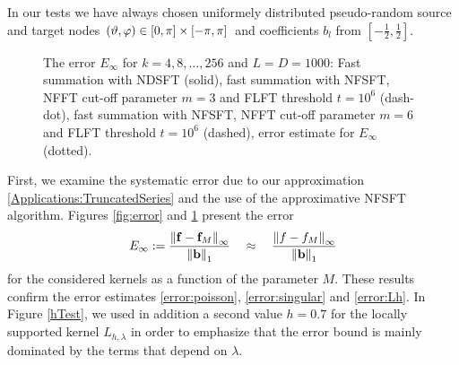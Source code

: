 In our tests we have always chosen uniformely distributed pseudo-random 
source and target nodes 
$\left(\vartheta,\varphi\right) \in [0,\pi] \times [-\pi,\pi]$ and 
coefficients $b_l$ from $\left[-\frac{1}{2},\frac{1}{2}\right]$.

\begin{figure}[tb]
  \centering
  \hfill
  \caption{The error $E_{\infty}$ for $k = 4,8,\ldots,256$ and $L = D = 1000$: 
  Fast summation with NDSFT (solid), fast summation with NFSFT, 
  NFFT cut-off parameter $m = 3$ and FLFT threshold $t = 10^6$ (dash-dot), 
  fast summation with NFSFT, NFFT cut-off parameter $m = 6$ and FLFT threshold 
  $t = 10^6$ (dashed), error estimate for $E_{\infty}$ (dotted).}
  \label{fig:error2}
\end{figure}

First, we examine the systematic error due to our approximation 
\eqref{Applications:TruncatedSeries} and the use of the 
approximative NFSFT algorithm. Figures \ref{fig:error} and
\ref{fig:error2} present
the error
\[
  E_{\infty}:=
  \frac{\left\|\mathbf{f}-\mathbf{f}_M\right\|_{\infty}}{\left\|\mathbf{b}\right\|_{1}}
  \quad \approx \quad \frac{\left\|f-f_M\right\|_{\infty}}{\left\|\mathbf{b}\right\|_{1}}
\]
for the considered kernels as a function of the parameter $M$.
These results confirm the error estimates \eqref{error:poisson},
\eqref{error:singular} and \eqref{error:Lh}. 
In Figure \ref{hTest},
we used in addition a second value $h=0.7$ for the locally supported 
kernel $L_{h,\lambda}$ in order to emphasize that the error 
bound is mainly dominated by the terms that depend on $\lambda$.

